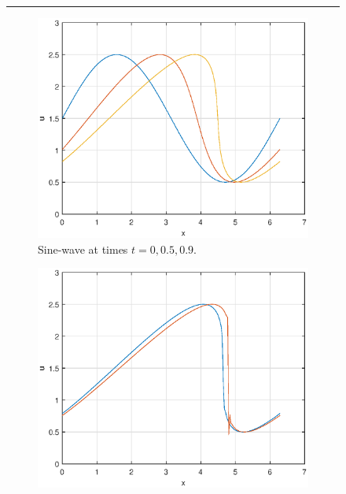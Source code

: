 \documentclass[a4paper, 12pt]{article}
\begin{document}
\begin{figure}[H]
\begin{center}
\rule{\linewidth}{.4pt}
\end{center}
\begin{subfigure}[b]{0.5\textwidth}
\includegraphics[width=\textwidth]{Q3sine_t=09}\hfill
\caption{Sine-wave at times $t=0,0.5,0.9$.}%
\end{subfigure}
\begin{subfigure}[b]{0.5\textwidth}
\includegraphics[width=\textwidth]{Q3sine_t=11}\hfill

\end{subfigure}
\end{figure}
\end{document}
